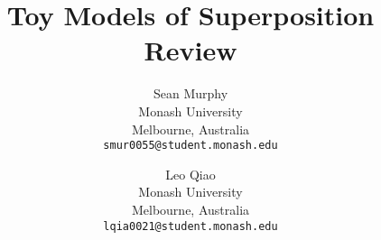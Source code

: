 \documentclass[10pt,twocolumn,letterpaper]{article}
\title{Toy Models of Superposition Review}
\author{Sean Murphy\\
Monash University\\
Melbourne, Australia\\
{\tt\small smur0055@student.monash.edu}
\and
Leo Qiao\\
Monash University\\
Melbourne, Australia\\
{\tt\small lqia0021@student.monash.edu}
}
\begin{document}
\maketitle

\pagebreak


{
	\small
	
	
}

% 
\end{document}
